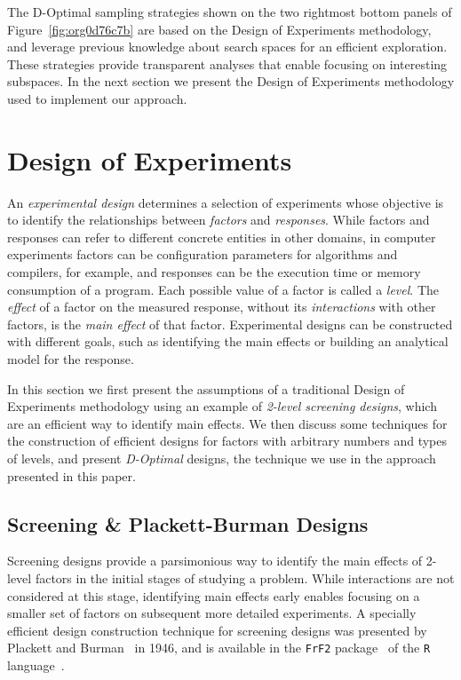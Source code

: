 \documentclass[conference]{IEEEtran}
\begin{document}
The D-Optimal sampling strategies shown on the two rightmost bottom panels of
Figure~\ref{fig:org0d76c7b} are based on the Design of Experiments
methodology, and leverage previous knowledge about search spaces for an
efficient exploration. These strategies provide transparent analyses that
enable focusing on interesting subspaces. In the next
section we present the Design of Experiments methodology used to implement our
approach.
\section{Design of Experiments}
\label{sec:org062a4f6}
An \emph{experimental design} determines a selection of experiments whose objective
is to identify the relationships between \emph{factors} and \emph{responses}. While
factors and responses can refer to different concrete entities in other domains,
in computer experiments factors can be configuration parameters for algorithms
and compilers, for example, and responses can be the execution time or memory
consumption of a program. Each possible value of a factor is called a \emph{level}.
The \emph{effect} of a factor on the measured response, without its \emph{interactions}
with other factors, is the \emph{main effect} of that factor. Experimental designs
can be constructed with different goals, such as identifying the main effects
or building an analytical model for the response.

In this section we first present the assumptions of a traditional Design of
Experiments methodology using an example of \emph{2-level screening designs}, which
are an efficient way to identify main effects. We then discuss some techniques
for the construction of efficient designs for factors with arbitrary numbers and
types of levels, and present \emph{D-Optimal} designs, the technique we use in the
approach presented in this paper.
\subsection{Screening \& Plackett-Burman Designs}
\label{sec:org98eab6c}
Screening designs provide a parsimonious way to identify the main
effects of 2-level factors in the initial stages of studying a problem. While
interactions are not considered at this stage, identifying main effects early
enables focusing on a smaller set of factors on subsequent more detailed
experiments. A specially efficient design construction technique for screening
designs was presented by Plackett and Burman~\cite{plackett1946design} in
1946, and is available in the \texttt{FrF2}
package~\cite{gromping2014frf2} of the \texttt{R}
language~\cite{team2018rlanguage}.
\end{document}

